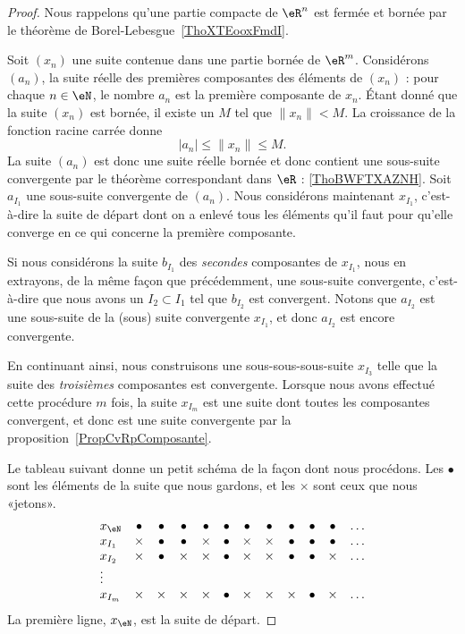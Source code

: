\begin{proof}
    Nous rappelons qu'une partie compacte de \( \eR^n\) est fermée et bornée par le théorème de Borel-Lebesgue~\ref{ThoXTEooxFmdI}.

    Soit $(x_n)$ une suite contenue dans une partie bornée de $\eR^m$. Considérons $(a_n)$, la suite réelle des premières composantes des éléments de $(x_n)$ : pour chaque $n\in\eN$, le nombre $a_n$ est la première composante de $x_n$. Étant donné que la suite $(x_n)$ est bornée, il existe un $M$ tel que $\| x_n \|<M$. La croissance de la fonction racine carrée donne
	\begin{equation}
        | a_n |\leq\| x_n \|\leq M.
	\end{equation}
    La suite $(a_n)$ est donc une suite réelle bornée et donc contient une sous-suite convergente par le théorème correspondant dans \( \eR\) :  \ref{ThoBWFTXAZNH}. Soit $a_{I_1}$ une sous-suite convergente de $(a_n)$. Nous considérons maintenant $x_{I_1}$, c'est-à-dire la suite de départ dont on a enlevé tous les éléments qu'il faut pour qu'elle converge en ce qui concerne la première composante.

	Si nous considérons la suite $b_{I_1}$ des \emph{secondes} composantes de $x_{I_1}$, nous en extrayons, de la même façon que précédemment, une sous-suite convergente, c'est-à-dire que nous avons un $I_2\subset I_1$ tel que $b_{I_2}$ est convergent. Notons que $a_{I_2}$ est une sous-suite de la (sous) suite convergente $x_{I_1}$, et donc $a_{I_2}$ est encore convergente.

	En continuant ainsi, nous construisons une sous-sous-sous-suite $x_{I_3}$ telle que la suite des \emph{troisièmes} composantes est convergente. Lorsque nous avons effectué cette procédure $m$ fois, la suite $x_{I_m}$ est une suite dont toutes les composantes convergent, et donc est une suite convergente par la proposition~\ref{PropCvRpComposante}.

	Le tableau suivant donne un petit schéma de la façon dont nous procédons. Les $\bullet$ sont les éléments de la suite que nous gardons, et les $\times$ sont ceux que nous «jetons».
	\begin{equation}
		\begin{array}{lccccccccccc}
			x_{\eN}	&	\bullet&\bullet&\bullet&\bullet&\bullet&\bullet&\bullet&\bullet&\bullet&\bullet&\ldots\\
			x_{I_1}	&	\times&\bullet&\bullet&\times&\bullet&\times&\times&\bullet&\bullet&\bullet&\ldots\\
			x_{I_2}	&	\times&\bullet&\times&\times&\bullet&\times&\times&\bullet&\bullet&\times&\ldots\\
			\vdots\\
			x_{I_m}	&	\times&\times&\times&\times&\bullet&\times&\times&\times&\bullet&\times&\ldots
		\end{array}
	\end{equation}
	La première ligne, $x_{\eN}$, est la suite de départ.
\end{proof}


